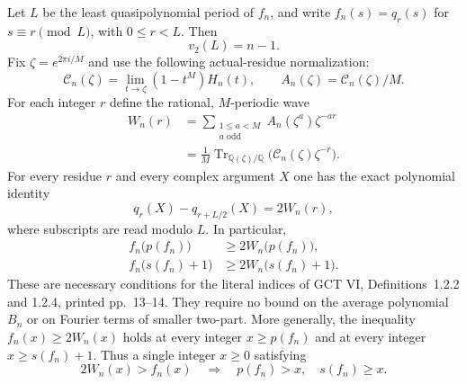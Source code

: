 \begin{proposition}
Let $L$ be the least quasipolynomial period of $f_n$, and write
$f_n(s)=q_r(s)$ for $s\equiv r\pmod L$, with
$0\le r<L$. Then
\[
                     v_2(L)=n-1.                            \tag{P-F56b}
\]
Fix $\zeta=e^{2\pi i/M}$ and use the following actual-residue normalization:
\[
 \mathcal C_n(\zeta)=\lim_{t\to\zeta}(1-t^M)H_n(t),
 \qquad A_n(\zeta)=\mathcal C_n(\zeta)/M.
\]
For each integer $r$ define the rational, $M$-periodic wave
\[
 \begin{split}
 W_n(r)
   &=\sum_{\substack{1\le a<M\\a\text{ odd}}}
                      A_n(\zeta^a)\zeta^{-ar}\\
   &=\frac1M\operatorname{Tr}_{\mathbb Q(\zeta)/\mathbb Q}
                  \bigl(\mathcal C_n(\zeta)\zeta^{-r}\bigr).
 \end{split}                                                 \tag{P-F56c}
\]
For every residue $r$ and every complex argument $X$ one has
the exact polynomial identity
\[
               q_r(X)-q_{r+L/2}(X)=2W_n(r),                 \tag{P-F56d}
\]
where subscripts are read modulo $L$. In particular,
\[
 \begin{split}
 f_n\bigl(p(f_n)\bigr)&\ge2W_n\bigl(p(f_n)\bigr),\\
 f_n\bigl(s(f_n)+1\bigr)&\ge2W_n\bigl(s(f_n)+1\bigr).
 \end{split}                                                 \tag{P-F56e}
\]
These are necessary conditions for the literal indices of
GCT VI, Definitions~1.2.2 and 1.2.4, printed pp.~13--14.
They require no bound on the average polynomial $B_n$ or on
Fourier terms of smaller two-part.
More generally, the inequality $f_n(x)\ge2W_n(x)$ holds
at every integer $x\ge p(f_n)$ and at every integer
$x\ge s(f_n)+1$. Thus a single integer $x\ge0$ satisfying
\[
          2W_n(x)>f_n(x)
       \quad\Longrightarrow\quad p(f_n)>x,
                                  \quad s(f_n)\ge x.
 \tag{P-F56e'}
\]


\end{proposition}
